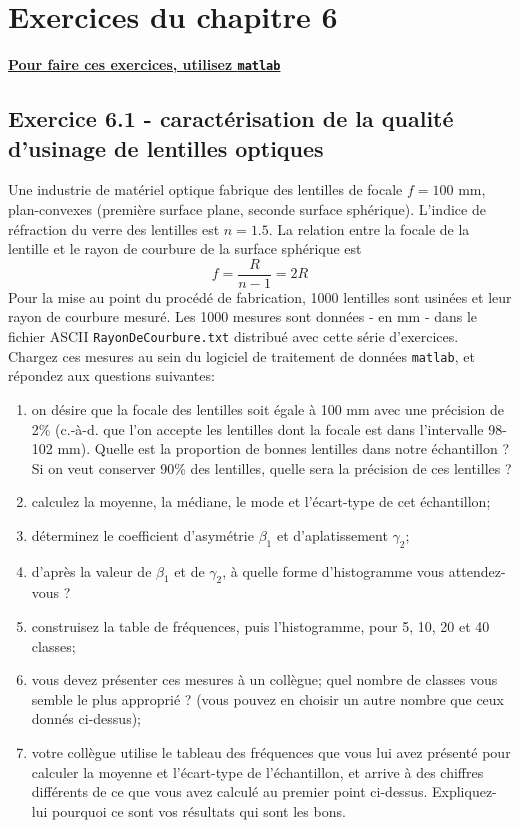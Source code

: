 \section{Exercices du chapitre 6}

\begin{center}
\Large \bf {\underline{Pour faire ces exercices, utilisez \texttt{matlab}}}
\end{center}

\subsection*{Exercice 6.1 - caractérisation de la qualité d'usinage de lentilles optiques}

Une industrie de matériel optique fabrique des lentilles de focale $f=100$ mm, plan-convexes (première surface plane, seconde surface sphérique). L'indice de réfraction du verre des lentilles est $n=1.5$. La relation entre la focale de la lentille et le rayon de courbure de la surface sphérique est
$$
f=\frac{R}{n-1}=2R
$$
Pour la mise au point du procédé de fabrication, 1000 lentilles sont usinées et leur rayon de courbure mesuré. Les 1000 mesures sont données - en mm - dans le fichier ASCII \texttt{RayonDeCourbure.txt} distribué avec cette série d'exercices. Chargez ces mesures au sein du logiciel de traitement de données \texttt{matlab}, et répondez aux questions suivantes:
\begin{enumerate}
\item on désire que la focale des lentilles soit égale à 100 mm avec une précision de 2\% (c.-à-d. que l'on accepte les lentilles dont la focale est dans l'intervalle 98-102 mm). Quelle est la proportion de bonnes lentilles dans notre échantillon ? Si on veut conserver 90\% des lentilles, quelle sera la précision de ces lentilles ?
\item calculez la moyenne, la médiane, le mode et l'écart-type de cet échantillon;
\item déterminez le coefficient d'asymétrie $\beta_1$ et d'aplatissement $\gamma_2$;
\item d'après la valeur de $\beta_1$ et de $\gamma_2$, à quelle forme d'histogramme vous attendez-vous ?
\item construisez la table de fréquences, puis l'histogramme, pour 5, 10, 20 et 40 classes;
\item vous devez présenter ces mesures à un collègue; quel nombre de classes vous semble le plus approprié ? (vous pouvez en choisir un autre nombre que ceux donnés ci-dessus);
\item votre collègue utilise le tableau des fréquences que vous lui avez présenté pour calculer la moyenne et l'écart-type de l'échantillon, et arrive à des chiffres différents de ce que vous avez calculé au premier point ci-dessus. Expliquez-lui pourquoi ce sont vos résultats qui sont les bons.
\end{enumerate}

